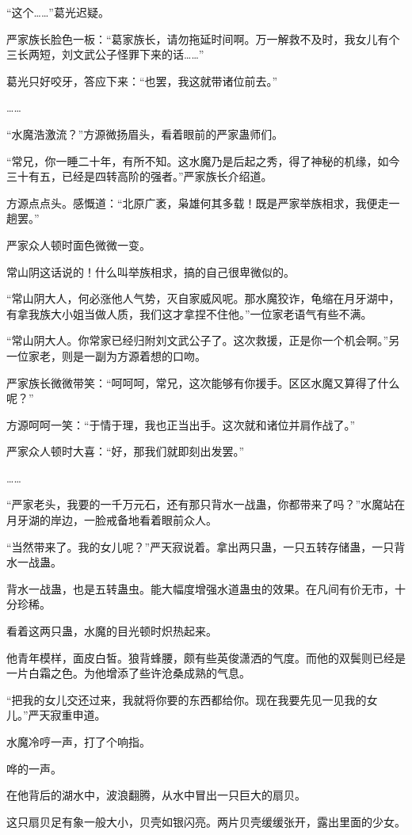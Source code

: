 \begin{this_body}
“这个……”葛光迟疑。

严家族长脸色一板：“葛家族长，请勿拖延时间啊。万一解救不及时，我女儿有个三长两短，刘文武公子怪罪下来的话……”

葛光只好咬牙，答应下来：“也罢，我这就带诸位前去。”

……

“水魔浩激流？”方源微扬眉头，看着眼前的严家蛊师们。

“常兄，你一睡二十年，有所不知。这水魔乃是后起之秀，得了神秘的机缘，如今三十有五，已经是四转高阶的强者。”严家族长介绍道。

方源点点头。感慨道：“北原广袤，枭雄何其多载！既是严家举族相求，我便走一趟罢。”

严家众人顿时面色微微一变。

常山阴这话说的！什么叫举族相求，搞的自己很卑微似的。

“常山阴大人，何必涨他人气势，灭自家威风呢。那水魔狡诈，龟缩在月牙湖中，有拿我族大小姐当做人质，我们这才拿捏不住他。”一位家老语气有些不满。

“常山阴大人。你常家已经归附刘文武公子了。这次救援，正是你一个机会啊。”另一位家老，则是一副为方源着想的口吻。

严家族长微微带笑：“呵呵呵，常兄，这次能够有你援手。区区水魔又算得了什么呢？”

方源呵呵一笑：“于情于理，我也正当出手。这次就和诸位并肩作战了。”

严家众人顿时大喜：“好，那我们就即刻出发罢。”

……

“严家老头，我要的一千万元石，还有那只背水一战蛊，你都带来了吗？”水魔站在月牙湖的岸边，一脸戒备地看着眼前众人。

“当然带来了。我的女儿呢？”严天寂说着。拿出两只蛊，一只五转存储蛊，一只背水一战蛊。

背水一战蛊，也是五转蛊虫。能大幅度增强水道蛊虫的效果。在凡间有价无市，十分珍稀。

看着这两只蛊，水魔的目光顿时炽热起来。

他青年模样，面皮白皙。狼背蜂腰，颇有些英俊潇洒的气度。而他的双鬓则已经是一片白霜之色。为他增添了些许沧桑成熟的气息。

“把我的女儿交还过来，我就将你要的东西都给你。现在我要先见一见我的女儿。”严天寂重申道。

水魔冷哼一声，打了个响指。

哗的一声。

在他背后的湖水中，波浪翻腾，从水中冒出一只巨大的扇贝。

这只扇贝足有象一般大小，贝壳如银闪亮。两片贝壳缓缓张开，露出里面的少女。


\end{this_body}
